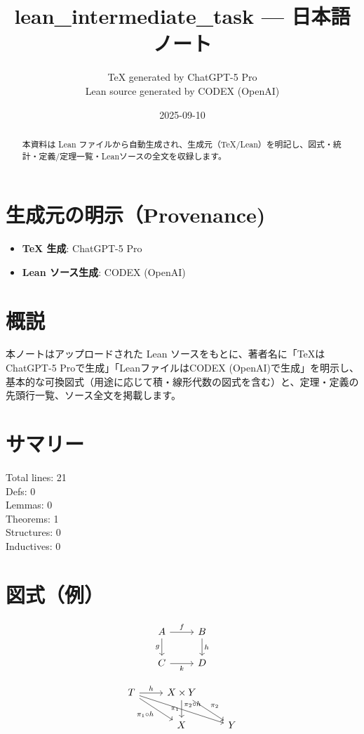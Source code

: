 \documentclass[12pt]{article}
\title{lean\_intermediate\_task — 日本語ノート}
\author{TeX generated by ChatGPT-5 Pro\\Lean source generated by CODEX (OpenAI)}
\date{2025-09-10}
\theoremstyle{definition}
\begin{document}
\maketitle

\begin{abstract}
本資料は Lean ファイルから自動生成され、生成元（TeX/Lean）を明記し、図式・統計・定義/定理一覧・Leanソースの全文を収録します。
\end{abstract}

\section*{生成元の明示（Provenance)}
\begin{itemize}
  \item \textbf{TeX 生成}: ChatGPT-5 Pro
  \item \textbf{Lean ソース生成}: CODEX (OpenAI)
\end{itemize}

\section*{概説}
本ノートはアップロードされた Lean ソースをもとに、著者名に「TeXはChatGPT-5 Proで生成」「LeanファイルはCODEX (OpenAI)で生成」を明示し、
基本的な可換図式（用途に応じて積・線形代数の図式を含む）と、定理・定義の先頭行一覧、ソース全文を掲載します。

\section*{サマリー}
Total lines: 21\\
Defs: 0\\
Lemmas: 0\\
Theorems: 1\\
Structures: 0\\
Inductives: 0

\section*{図式（例）}

\[
\begin{tikzcd}
A \arrow[r, "f"] \arrow[d, "g"'] & B \arrow[d, "h"] \\
C \arrow[r, "k"'] & D
\end{tikzcd}
\]



\[
\begin{tikzcd}
T \arrow[r, "h"] \arrow[dr, swap, "\pi_1\circ h"] \arrow[drr, "\pi_2\circ h"] & X\times Y \arrow[d, swap, "\pi_1"] \arrow[dr, "\pi_2"] \\
& X & Y
\end{tikzcd}
\]
\end{document}
